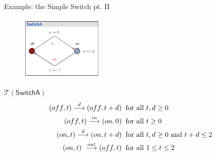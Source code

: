 \documentclass{beamer}
\def\TL#1{\mathcal{T}(#1)}
\begin{document}
\begin{slide}{Example: the Simple Switch pt. II}

\begin{figure}[htb]
  \centering
  \includegraphics[width=4cm]{./images/PASswitchA.jpg}\\
\end{figure}
\vfill
\begin{block}{$\TL{\mathsf{SwitchA}}$}
\begin{align*}
(off,t) \stackrel{d}{\longrightarrow} (off,t+d)\; & \; \text{for all $t,d \geq 0$}\\
(off,t) \stackrel{in}{\longrightarrow} (on,0)\; & \; \text{for all $t \geq 0$}\\
(on,t) \stackrel{d}{\longrightarrow} (on,t+d)\; & \; \text{for all $t,d \geq 0$ and $t+d \leq 2$}\\
(on,t) \ \stackrel{out}{\longrightarrow} (off,t)\; & \; \text{for all $1 \leq t \leq 2$}
\end{align*}
\end{block}
\end{slide}
\end{document}

